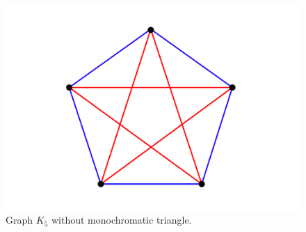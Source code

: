 \documentclass[12pt,twoside,a4paper,bibliography=totocnumbered]{book}
\numberwithin{equation}{section}
\theoremstyle{remark}
\begin{document}
\begin{figure}[H]
     \centering
     \includegraphics[scale=1]{Figuras/K5-sem-triangulo.jpg}
     \caption{Graph $K_5$ without monochromatic triangle.}
     \label{fig:K5}
\end{figure}
\end{document}
